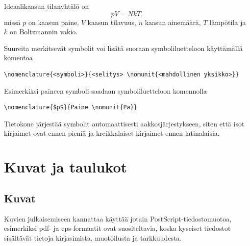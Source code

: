 \documentclass[finnish,twoside,openright,utf]{HYgradu}
\begin{document}
Ideaalikaasun tilanyhtälö on
\begin{equation}
\label{eq:ideal}
pV=NkT,
\end{equation}
missä $p$ on kaasun paine, $V$ kaasun tilavuus, $n$ kaasun ainemäärä, $T$ lämpötila ja $k$ on Boltzmannin vakio.

Suureita merkitsevät symbolit voi lisätä suoraan symboliluetteloon käyttämällä komentoa
\begin{verbatim}
\nomenclature{<symboli>}{<selitys> \nomunit{<mahdollinen yksikko>}}
\end{verbatim}
Esimerkiksi paineen symboli saadaan symboliluetteloon komennolla
\begin{verbatim}
\nomenclature{$p$}{Paine \nomunit{Pa}}
\end{verbatim}
Tietokone järjestää symbolit automaattisesti aakkosjärjestykseen, siten että isot kirjaimet ovat ennen pieniä ja kreikkalaiset kirjaimet ennen latinalaisia.

\begin{center}
\end{center}

\chapter{Kuvat ja taulukot}

\section{Kuvat}
Kuvien julkaisemiseen kannattaa käyttää  jotain PostScript-tiedostomuotoa, esimerkiksi pdf- ja eps-formaatit ovat suositeltavia, koska kyseiset tiedostot sisältävät tietoja kirjasimista, muotoilusta ja tarkkuudesta.
\end{document}
